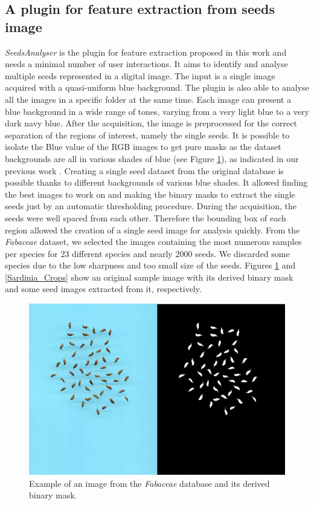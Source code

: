 \documentclass[a4paper,12pt]{article}
\begin{document}
\subsection{A plugin for feature extraction from seeds image}
\label{seeds_analyser}
\emph{SeedsAnalyser} is the plugin for feature extraction proposed in this work and needs a minimal number of user interactions. It aims to identify and analyse multiple seeds represented in a digital image. The input is a single image acquired with a quasi-uniform blue background.
The plugin is also able to analyse all the images in a specific folder at the same time. Each image can present a blue background in a wide range of tones, varying from a very light blue to a very dark navy blue. After the acquisition, the image is preprocessed for the correct separation of the regions of interest, namely the single seeds. 
It is possible to isolate the Blue value of the RGB images to get pure masks as the dataset backgrounds are all in various shades of blue (see Figure \ref{Sardinia_Masks}), as indicated in our previous work \cite{Loddo20}. 
Creating a single seed dataset from the original database is possible thanks to different backgrounds of various blue shades. It allowed finding the best images to work on and making the binary masks to extract the single seeds just by an automatic thresholding procedure.
During the acquisition, the seeds were well spaced from each other. Therefore the bounding box of each region allowed the creation of a single seed image for analysis quickly.
From the \emph{Fabaceae} dataset, we selected the images containing the most numerous samples per species for 23 different species and nearly 2000 seeds.
We discarded some species due to the low sharpness and too small size of the seeds. Figures \ref{Sardinia_Masks} and \ref{Sardinia_Crops} show an original sample image with its derived binary mask and some seed images extracted from it, respectively. 
\begin{figure}[tbp]
	\centering
	\includegraphics[scale=0.6]{Img/SardiniaMasks.png}
	\caption{Example of an image from the \emph{Fabaceae} database and its derived binary mask.}
	\label{Sardinia_Masks}
\end{figure}
\end{document}

